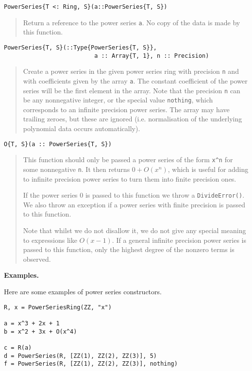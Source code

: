 \documentclass[a4paper,10pt]{article}
\newcommand{\code}{\lstinline}
\newcommand{\desc}[1]{\vspace{-3mm}\begin{quote}#1\end{quote}}
\begin{document}
{{\begin{lstlisting}
PowerSeries{T <: Ring, S}(a::PowerSeries{T, S})
\end{lstlisting}

\desc{Return a reference to the power series \code{a}. No copy of the data is
made by this function.}

\begin{lstlisting}
PowerSeries{T, S}(::Type{PowerSeries{T, S}}, 
                          a :: Array{T, 1}, n :: Precision)
\end{lstlisting}

\desc{Create a power series in the given power series ring with precision
\code{n} and with coefficients given by the array \code{a}. The constant 
coefficient of the power series will be the first element in the array. Note
that the precision \code{n} can be any nonnegative integer, or the special
value \code{nothing}, which corresponds to an infinite precision power series.
The array may have trailing zeroes, but these are ignored (i.e. normalisation
of the underlying polynomial data occurs automatically).}

\begin{lstlisting}
O{T, S}(a :: PowerSeries{T, S})
\end{lstlisting}

\desc{This function should only be passed a power series of the form \code{x^n}
for some nonnegative \code{n}. It then returns $0 + O(x^n)$, which is useful
for adding to infinite precision power series to turn them into finite 
precision ones. 

If the power series $0$ is passed to this function we throw a 
\code{DivideError()}. We also throw an exception if a power series with finite
precision is passed to this function.

Note that whilst we do not disallow it, we do not give any special meaning to
expressions like $O(x - 1)$. If a general infinite precision power series is
passed to this function, only the highest degree of the nonzero terms is
observed.}

\textbf{Examples.}

Here are some examples of power series constructors.

\begin{lstlisting}
R, x = PowerSeriesRing(ZZ, "x")

a = x^3 + 2x + 1
b = x^2 + 3x + O(x^4)

c = R(a)
d = PowerSeries(R, [ZZ(1), ZZ(2), ZZ(3)], 5)
f = PowerSeries(R, [ZZ(1), ZZ(2), ZZ(3)], nothing)


\end{lstlisting}}}
\end{document}
